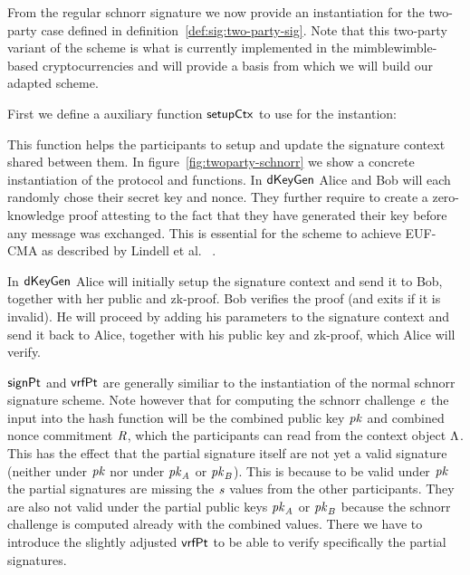 From the regular schnorr signature we now provide an instantiation for the two-party case defined in definition~\ref{def:sig:two-party-sig}. Note that this two-party variant of the scheme is what is
currently implemented in the mimblewimble-based cryptocurrencies and will provide a basis from which we will build our adapted scheme.

First we define a auxiliary function $\mathsf{setupCtx}$ to use for the instantion:

\begin{center}
    \fbox{
    \begin{varwidth}{\textwidth}
        \procedure[linenumbering]{$\procSetupCtx{\varSigContext}{\varPubKeyAlice}{\varRandAlice}$} {
        \opAccess{\varSigContext}{\varPubKey} \opAssign \opAccess{\varSigContext}{\varPubKey} \opAddPoint \varPubKeyAlice \\
        \opAccess{\varSigContext}{\varRand} \opAssign \opAccess{\varSigContext}{\varRand} \opAddPoint \varRandAlice \\
        \pcreturn \varSigContext
        } \\
    \end{varwidth}
    }
\end{center}

This function helps the participants to setup and update the signature context shared between them. In figure~\ref{fig:twoparty-schnorr} we show a concrete instantiation of the protocol and functions. In $\mathsf{dKeyGen}$ Alice
and Bob will each randomly chose their secret key and nonce. They further require to create a zero-knowledge proof attesting to the fact that they have generated their key before any message was exchanged. This
is essential for the scheme to achieve EUF-CMA as described by Lindell et al. ~\cite{lindell2017fast}.

In $\mathsf{dKeyGen}$ Alice will initially setup the signature context and send it to Bob, together with her public and zk-proof.
Bob verifies the proof (and exits if it is invalid). He will proceed by adding his parameters to the signature context and send it back to Alice, together with his public key and zk-proof, which Alice will verify.

$\mathsf{signPt}$ and $\mathsf{vrfPt}$ are generally similiar to the instantiation of the normal schnorr signature scheme. Note however that for computing the schnorr challenge $\mathit{e}$ the input into
the hash function will be the combined public key $\mathit{pk}$ and combined nonce commitment $\mathit{R}$, which the participants can read from the context object $\Lambda$. This has the effect that the partial
signature itself are not yet a valid signature (neither under $\mathit{pk}$ nor under $\mathit{pk}_{\mathit{A}}$ or $\mathit{pk}_{\mathit{B}}$). This is because to be valid under $\mathit{pk}$ the partial signatures are missing the $\mathit{s}$ values
from the other participants. They are also not valid under the partial public keys $\mathit{pk}_{\mathit{A}}$ or $\mathit{pk}_{\mathit{B}}$ because the schnorr challenge is computed already with the combined values. There we have
to introduce the slightly adjusted $\mathsf{vrfPt}$ to be able to verify specifically the partial signatures.

